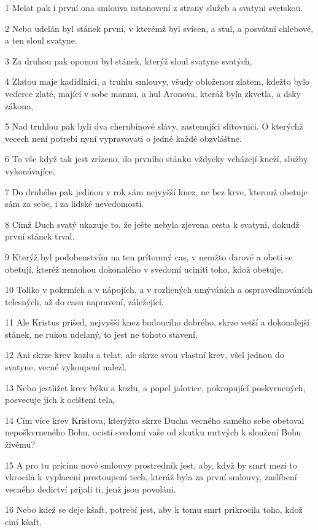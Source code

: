 \par 1 Melat pak i první ona smlouva ustanovení z strany služeb a svatyni svetskou.
\par 2 Nebo udelán byl stánek první, v kterémž byl svícen, a stul, a posvátní chlebové, a ten sloul svatyne.
\par 3 Za druhou pak oponou byl stánek, kterýž sloul svatyne svatých,
\par 4 Zlatou maje kadidlnici, a truhlu smlouvy, všudy obloženou zlatem, kdežto bylo vederce zlaté, mající v sobe mannu, a hul Aronova, kteráž byla zkvetla, a dsky zákona,
\par 5 Nad truhlou pak byli dva cherubínové slávy, zastenujíci slitovnici. O kterýchž vecech není potrebí nyní vypravovati o jedné každé obzvláštne.
\par 6 To vše když tak jest zrízeno, do prvního stánku vždycky vcházejí kneží, služby vykonávajíce,
\par 7 Do druhého pak jedinou v rok sám nejvyšší knez, ne bez krve, kterouž obetuje sám za sebe, i za lidské nevedomosti.
\par 8 Címž Duch svatý ukazuje to, že ješte nebyla zjevena cesta k svatyni, dokudž první stánek trval.
\par 9 Kterýž byl podobenstvím na ten prítomný cas, v nemžto darové a obeti se obetují, kteréž nemohou dokonalého v svedomí uciniti toho, kdož obetuje,
\par 10 Toliko v pokrmích a v nápojích, a v rozlicných umýváních a ospravedlnováních telesných, až do casu napravení, záležející.
\par 11 Ale Kristus prišed, nejvyšší knez budoucího dobrého, skrze vetší a dokonalejší stánek, ne rukou udelaný, to jest ne tohoto stavení,
\par 12 Ani skrze krev kozlu a telat, ale skrze svou vlastní krev, všel jednou do svatyne, vecné vykoupení nalezl.
\par 13 Nebo jestližet krev býku a kozlu, a popel jalovice, pokropující poskvrnených, posvecuje jich k ocištení tela,
\par 14 Cím více krev Kristova, kterýžto skrze Ducha vecného samého sebe obetoval nepoškvrneného Bohu, ocistí svedomí vaše od skutku mrtvých k sloužení Bohu živému?
\par 15 A pro tu prícinu nové smlouvy prostredník jest, aby, když by smrt mezi to vkrocila k vyplacení prestoupení tech, kteráž byla za první smlouvy, zaslíbení vecného dedictví prijali ti, jenž jsou povoláni.
\par 16 Nebo kdež se deje kšaft, potrebí jest, aby k tomu smrt prikrocila toho, kdož ciní kšaft.
